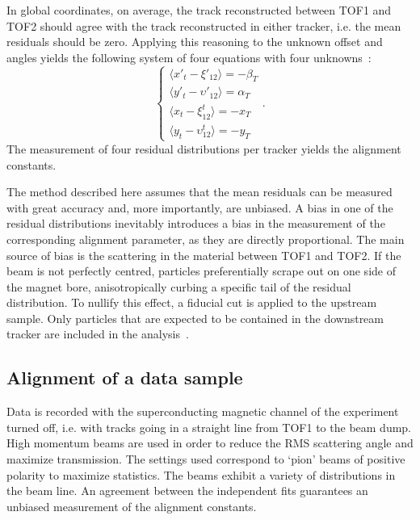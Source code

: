In global coordinates, on average, the track reconstructed between TOF1 and TOF2 should agree with the track reconstructed in either tracker, i.e. the mean residuals should be zero. Applying this reasoning to the unknown offset and angles yields the following system of four equations with four unknowns~\cite{2018arXiv1805.06623T}:
\begin{equation}
\left\{
\begin{array}{l}
\langle x'_t-\xi'_{12}\rangle = - \beta_T \\
\langle y'_t-\upsilon'_{12}\rangle = \alpha_T \\
\langle x_t-\xi_{12}^t\rangle = - x_T \\
\langle y_t-\upsilon_{12}^t\rangle = - y_T
\end{array}
\right. .
\label{eq:res}
\end{equation}
The measurement of four residual distributions per tracker yields the alignment constants.

The method described here assumes that the mean residuals can be measured with great accuracy and, more importantly, are unbiased. A bias in one of the residual distributions inevitably introduces a bias in the measurement of the corresponding alignment parameter, as they are directly proportional. The main source of bias is the scattering in the material between TOF1 and TOF2. If the beam is not perfectly centred, particles preferentially scrape out on one side of the magnet bore, anisotropically curbing a specific tail of the residual distribution. To nullify this effect, a fiducial cut is applied to the upstream sample. Only particles that are expected to be contained in the downstream tracker are included in the analysis~\cite{2018arXiv1805.06623T}.


\subsection{Alignment of a data sample}
\label{SubSect:DA_Data}
Data is recorded with the superconducting magnetic channel of the experiment turned off, i.e. with tracks going in a straight line from TOF1 to the beam dump. High momentum beams are used in order to reduce the RMS scattering angle and maximize transmission. The settings used correspond to `pion' beams of positive polarity to maximize statistics. The beams exhibit a variety of distributions in the beam line.  An agreement between the independent fits guarantees an unbiased measurement of the alignment constants.

